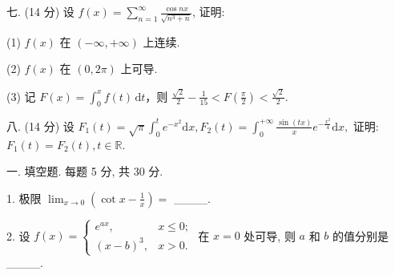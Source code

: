 \documentclass{examcollection}
\begin{document}
{\begin{minipage}{\textwidth}
七. (14 分) 设 $f(x) = \sum_{n=1}^{\infty} \frac{\cos nx}{\sqrt{n^3 + n}}$, 证明:\par
(1) $f(x)$ 在 $(- \infty, + \infty)$ 上连续.\par
(2) $f(x)$ 在 $(0,2\pi)$ 上可导.\par
(3) 记 $F(x) = \int_{0}^{x} f(t) \, \mathrm{d}t$，则 $\frac{\sqrt{2}}{2} - \frac{1}{15} < F\left(\frac{\pi}{2}\right) < \frac{\sqrt{2}}{2}$.\par
八. (14 分) 设 $F_{1}(t) = \sqrt{\pi} \int_{0}^{t} e^{-x^{2}} \mathrm{d}x, F_{2}(t) = \int_{0}^{+\infty} \frac{\sin(tx)}{x} e^{-\frac{x^{2}}{4}} \mathrm{d}x,$ 证明: $F_{1}(t) = F_{2}(t), t \in \mathbb{R}$.\par
{}\smallskip
一. 填空题. 每题 5 分, 共 30 分.\par
1. 极限 $\lim_{x\to 0}\left(\cot x - \frac{1}{x}\right) =$ \_\_\_\_.\par
2. 设 $f(x) = \begin{cases} e^{ax}, & x \leq 0; \\ (x - b)^3, & x > 0. \end{cases}$ 在 $x = 0$ 处可导, 则 $a$ 和 $b$ 的值分别是 \_\_\_\_.\par
\end{minipage}}
\ifdim\dimexpr\ht\proofbox+\dp\proofbox\relax>\textheight
\noindent\resizebox{!}{\textheight}{\usebox{\proofbox}}\else\noindent\usebox{\proofbox}\fi\clearpage
\end{document}
